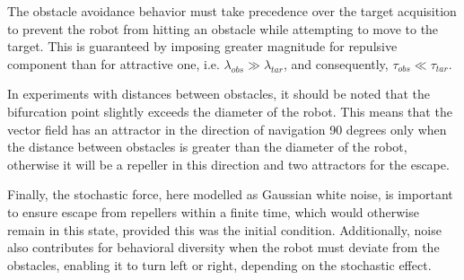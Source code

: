 The obstacle avoidance behavior must take precedence over the target acquisition
to prevent the robot from hitting an obstacle while attempting to move to the
target. This is guaranteed by imposing greater magnitude for repulsive component than for
attractive one, i.e. $\lambda_{obs} \gg \lambda_{tar}$, and consequently,
$\tau_{obs} \ll \tau_{tar}$.

In experiments with distances between obstacles, it should be noted that the
bifurcation point slightly exceeds the diameter of the robot. This means that
the vector field has an attractor in the direction of navigation 90 degrees only
when the distance between obstacles is greater than the diameter of the robot,
otherwise it will be a repeller in this direction and two attractors for the
escape.

Finally, the stochastic force, here modelled as Gaussian white noise, is
important to ensure escape from repellers within a finite time, which would
otherwise remain in this state, provided this was the initial
condition. Additionally, noise also contributes for behavioral diversity when
the robot must deviate from the obstacles, enabling it to turn left or right,
depending on the stochastic effect. 

